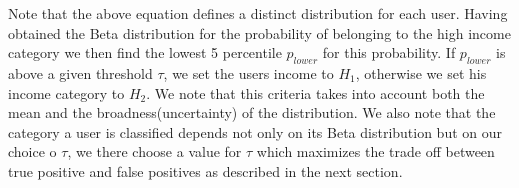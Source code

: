 Note that the above equation defines a distinct distribution for each user. Having obtained the Beta distribution for the probability of belonging to the high income category we then find the lowest 5 percentile $p_{lower}$ for this probability. If $p_{lower}$ is above a given threshold $\tau$, we set the users income to $H_1$, otherwise we set his income category to $H_2$. We note that this criteria takes into account both the mean and the broadness(uncertainty) of the distribution. We also note that the category a user is classified depends not only on its Beta distribution but on our choice o $\tau$, we there choose a value for $\tau$ which maximizes the trade off between true positive and false positives as described in the next section.
 





